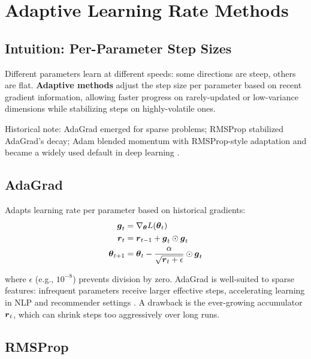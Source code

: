 
\section{Adaptive Learning Rate Methods}
\label{sec:adaptive-methods}

\subsection{Intuition: Per-Parameter Step Sizes}

Different parameters learn at different speeds: some directions are steep, others are flat. \textbf{Adaptive methods} adjust the step size per parameter based on recent gradient information, allowing faster progress on rarely-updated or low-variance dimensions while stabilizing steps on highly-volatile ones.

Historical note: AdaGrad emerged for sparse problems; RMSProp stabilized AdaGrad's decay; Adam blended momentum with RMSProp-style adaptation and became a widely used default in deep learning \cite{Duchi2011,Tieleman2012,Kingma2014,GoodfellowEtAl2016}.

\subsection{AdaGrad}

Adapts learning rate per parameter based on historical gradients:
\begin{align}
\boldsymbol{g}_t &= \nabla_{\boldsymbol{\theta}} L(\boldsymbol{\theta}_t) \\
\boldsymbol{r}_t &= \boldsymbol{r}_{t-1} + \boldsymbol{g}_t \odot \boldsymbol{g}_t \\
\boldsymbol{\theta}_{t+1} &= \boldsymbol{\theta}_t - \frac{\alpha}{\sqrt{\boldsymbol{r}_t + \epsilon}} \odot \boldsymbol{g}_t
\end{align}

where $\epsilon$ (e.g., $10^{-8}$) prevents division by zero. AdaGrad is well-suited to sparse features: infrequent parameters receive larger effective steps, accelerating learning in NLP and recommender settings \cite{Duchi2011,WebOptimizationDLBook,D2LChapterOptimization}. A drawback is the ever-growing accumulator \(\boldsymbol{r}_t\), which can shrink steps too aggressively over long runs.

\subsection{RMSProp}

